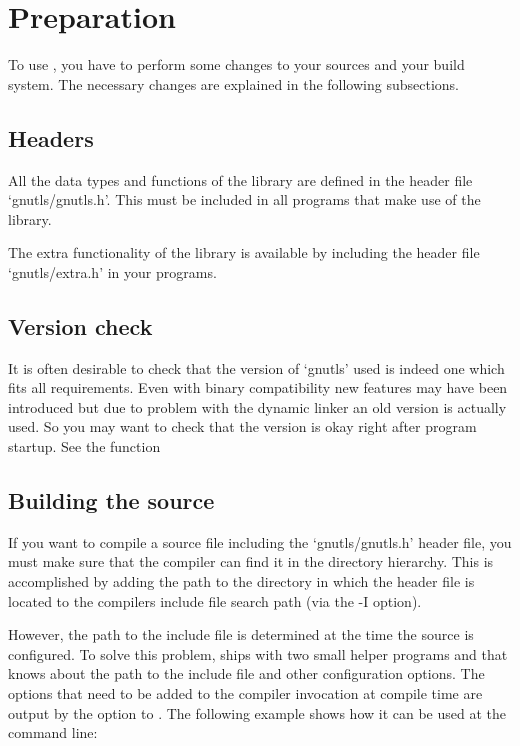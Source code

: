 \section{Preparation}

To use \gnutls{}, you have to perform some changes to your sources and
your build system. The necessary changes are explained in the following
subsections.

\subsection{Headers}

All the data types and functions of the \gnutls{} library are defined in
the header file `gnutls/gnutls.h'. This must be included in all programs that
make use of the \gnutls{} library.
\par
The extra functionality of the \gnutlse{} library is available by
including the header file `gnutls/extra.h' in your programs.

\subsection{Version check}
It is often desirable to check that the version of `gnutls' used is indeed
one which fits all requirements.  Even with binary compatibility new
features may have been introduced but due to problem with the dynamic
linker an old version is actually used.  So you may want to check that
the version is okay right after program startup.
See the function 


\subsection{Building the source}

If you want to compile a source file including the `gnutls/gnutls.h' header
file, you must make sure that the compiler can find it in the
directory hierarchy.  This is accomplished by adding the path to the
directory in which the header file is located to the compilers include
file search path (via the -I option).

However, the path to the include file is determined at the time the
source is configured.  To solve this problem, \gnutls{} ships with two small
helper programs  and 
that knows about the path to the
include file and other configuration options.  The options that need
to be added to the compiler invocation at compile time are output by
the  option to .  The following
example shows how it can be used at the command line:

